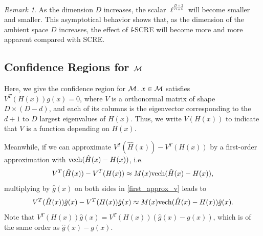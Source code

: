 \documentclass[aos,preprint]{imsart}
\theoremstyle{remark}
\newtheorem*{remark}{Remark}
\begin{document}
\begin{remark}
As the dimension $D$ increases, the scalar $\ell^{\frac{D+2}{D+6}}$ will become smaller and smaller. This asymptotical behavior shows that, as the dimension of the ambient space $D$ increases, the effect of {\it l}-SCRE will become more and more apparent compared with SCRE.
\end{remark}

\subsection{Confidence Regions for $\cal M$}
Here, we give the confidence region for $\cal M$. $x\in\cal M$ satisfies $V^T(H(x))g(x) = 0$, where $V$ is a orthonormal matrix of shape $D\times (D-d)$, and each of its columns is the eigenvector corresponding to the $d+1$ to $D$ largest eigenvalues of $H(x)$. Thus, we write $V(H(x))$ to indicate that $V$ is a function depending on $H(x)$.

Meanwhile, if we can approximate $V^T({\hat{H}}(x))- V^T(H(x))$ by a first-order approximation with ${\rm vech}(\hat{H}(x)-H(x))$, i.e.
\begin{equation}\label{first_approx_v}
V^T({\hat{H}}(x))- V^T(H(x))\approx M(x){\rm vech}(\hat{H}(x)-H(x)),
\end{equation}
multiplying by $\hat{g}(x)$ on both sides in \eqref{first_approx_v} leads to
\[
V^T({\hat{H}}(x))\hat{g}(x)- V^T(H(x))\hat{g}(x)\approx M(x){\rm vech}(\hat{H}(x)-H(x))\hat{g}(x).
\]
Note that $V^T(H(x))\hat{g}(x) = V^T(H(x))(\hat{g}(x) - g(x))$, which is of the same order as $\hat{g}(x) - g(x)$.
\end{document}
